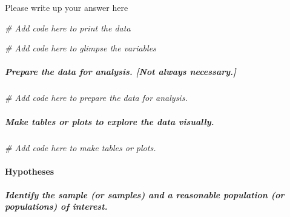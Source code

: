 \documentclass[
]{book}
\newenvironment{Shaded}{\begin{snugshade}}{\end{snugshade}}
\newcommand{\CommentTok}[1]{\textcolor[rgb]{0.56,0.35,0.01}{\textit{#1}}}
\begin{document}
Please write up your answer here

\begin{Shaded}
\begin{Highlighting}[]
\CommentTok{\# Add code here to print the data}
\end{Highlighting}
\end{Shaded}

\begin{Shaded}
\begin{Highlighting}[]
\CommentTok{\# Add code here to glimpse the variables}
\end{Highlighting}
\end{Shaded}

\hypertarget{prepare-the-data-for-analysis.-not-always-necessary.}{%
\subparagraph*{Prepare the data for analysis. {[}Not always necessary.{]}}\label{prepare-the-data-for-analysis.-not-always-necessary.}}

\begin{Shaded}
\begin{Highlighting}[]
\CommentTok{\# Add code here to prepare the data for analysis.}
\end{Highlighting}
\end{Shaded}

\hypertarget{make-tables-or-plots-to-explore-the-data-visually.}{%
\subparagraph*{Make tables or plots to explore the data visually.}\label{make-tables-or-plots-to-explore-the-data-visually.}}

\begin{Shaded}
\begin{Highlighting}[]
\CommentTok{\# Add code here to make tables or plots.}
\end{Highlighting}
\end{Shaded}

\hypertarget{hypotheses}{%
\paragraph*{Hypotheses}\label{hypotheses}}

\hypertarget{identify-the-sample-or-samples-and-a-reasonable-population-or-populations-of-interest.}{%
\subparagraph*{Identify the sample (or samples) and a reasonable population (or populations) of interest.}\label{identify-the-sample-or-samples-and-a-reasonable-population-or-populations-of-interest.}}
\end{document}
